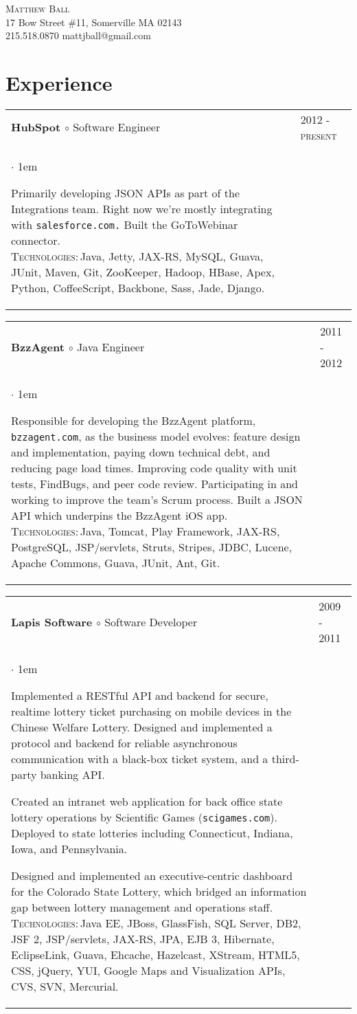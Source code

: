 \documentclass[10pt]{article}
\makeatletter
\newcommand{\employer}[4]
	{{ \begin{tabular}{l@{\hspace{5mm}}|p{30mm}}
	   \multicolumn{1}{l}{\textbf{#1 $\circ$ }#2}&\multicolumn{1}{p{30mm}}{\hspace{-3mm}\textsc{#3}} \\
	   \parbox{.825\textwidth}{#4 \vspace*{-4pt}}
	   \end{tabular} \vspace{4pt} }}
\newcommand{\contact}[4]
	{\begin{center}
		{\LARGE \scshape{#1}}\\
		#2\\
		\Telefon \hspace{0.5ex} #3 \hspace{1em} \Letter \hspace{0.5ex} #4
	\end{center}
	\vspace*{-8pt}}
\newenvironment{achievements}           %
	{\begin{list}{$\cdot$}{\topsep 0pt \itemsep 4pt \parsep 0pt \leftmargin 1em}
	 \linespread{1.05} \selectfont %
	}
	{\end{list}\vspace*{4pt}}
\def\kt{\vspace*{2pt}\\\textsc{Technologies:\,}}
\makeatother
\begin{document}
\contact{Matthew Ball}
{17 Bow Street \#11, Somerville MA 02143}
{215.518.0870}
{mattjball@gmail.com}

\section{Experience}
\employer{HubSpot}{Software Engineer}{2012 - present}{
	\begin{achievements}
	
	\item{Primarily developing JSON APIs as part of the Integrations team. Right now we're mostly integrating with \texttt{salesforce.com.} Built the GoToWebinar connector. \kt Java, Jetty, JAX-RS, MySQL, Guava, JUnit, Maven, Git, ZooKeeper, Hadoop, HBase, Apex, Python, CoffeeScript, Backbone, Sass, Jade, Django. }
	
	\end{achievements}
}

\employer{BzzAgent}{Java Engineer}{2011 - 2012}{
	\begin{achievements}
	
	\item{Responsible for developing the BzzAgent platform, \texttt{bzzagent.com}, as the business model evolves: feature design and implementation, paying down technical debt, and reducing page load times. Improving code quality with unit tests, FindBugs, and peer code review. Participating in and working to improve the team's Scrum process. Built a JSON API which underpins the BzzAgent iOS app. \kt Java, Tomcat, Play Framework, JAX-RS, PostgreSQL, JSP/servlets, Struts, Stripes, JDBC, Lucene, Apache Commons, Guava, JUnit, Ant, Git.}
	
	\end{achievements}
}

\employer{Lapis Software}{Software Developer}{2009 - 2011}{
	\begin{achievements}
	
	\item{Implemented a RESTful API and backend for secure, realtime lottery ticket purchasing on mobile devices in the Chinese Welfare Lottery. Designed and implemented a protocol and backend for reliable asynchronous communication with a black-box ticket system, and a third-party banking API.}
	
\item{Created an intranet web application for back office state lottery operations by Scientific Games (\texttt{scigames.com}). Deployed to state lotteries including Connecticut, Indiana, Iowa, and Pennsylvania.}
	
\item{Designed and implemented an executive-centric dashboard for the Colorado State Lottery, which bridged an information gap between lottery management and operations staff. \kt Java EE, JBoss, GlassFish, SQL Server, DB2, JSF 2, JSP/servlets, JAX-RS, JPA, EJB 3, Hibernate, EclipseLink, Guava, Ehcache, Hazelcast, XStream, HTML5, CSS, jQuery, YUI, Google Maps and Visualization APIs, CVS, SVN, Mercurial.}
	
	\end{achievements}
}
\end{document}
